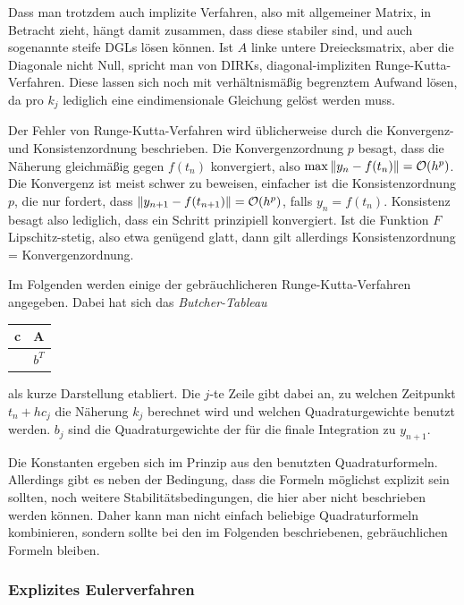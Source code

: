 Dass man trotzdem auch implizite Verfahren, also mit allgemeiner
Matrix, in Betracht zieht, hängt damit zusammen, dass diese stabiler
sind, und auch sogenannte steife DGLs lösen können. Ist $A$ linke
untere Dreiecksmatrix, aber die Diagonale nicht Null, spricht man von
DIRKs, diagonal-impliziten Runge-Kutta-Verfahren. Diese lassen sich
noch mit verhältnismäßig begrenztem Aufwand lösen, da pro $k_j$
lediglich eine eindimensionale Gleichung gelöst werden muss.

Der Fehler von Runge-Kutta-Verfahren wird üblicherweise durch die
Konvergenz- und Konsistenzordnung beschrieben. Die Konvergenzordnung
$p$ besagt, dass die Näherung gleichmäßig gegen $f(t_n)$ konvergiert, also
$\max \left\lVert{y_n - f(t_n)}\right\rVert = \mathcal O(h^p)$. Die Konvergenz ist
meist schwer zu beweisen, einfacher ist die Konsistenzordnung $p$, die
nur fordert, dass $\left\lVert{y_{n+1} - f(t_{n+1})}\right\rVert = \mathcal O(h^p)$, falls
$y_n=f(t_n)$. Konsistenz besagt also lediglich, dass ein Schritt
prinzipiell konvergiert. Ist die Funktion $F$ Lipschitz-stetig, also
etwa genügend glatt, dann gilt allerdings Konsistenzordnung =
Konvergenzordnung.

%
Im Folgenden werden einige der gebräuchlicheren Runge-Kutta-Verfahren
angegeben. Dabei hat sich das \emph{Butcher-Tableau}
\begin{center}
  \renewcommand{\arraystretch}{1.3}
  \begin{tabular}{r|l}
    c & A \\\hline
    & $b^T$
  \end{tabular}
\end{center}
als kurze Darstellung etabliert. Die $j$-te Zeile gibt dabei an, zu
welchen Zeitpunkt $t_n + hc_j$ die Näherung $k_j$ berechnet wird und
welchen Quadraturgewichte benutzt werden. $b_j$ sind die
Quadraturgewichte der für die finale Integration zu $y_{n+1}$.

Die Konstanten ergeben sich im Prinzip aus den benutzten
Quadraturformeln. Allerdings gibt es neben der Bedingung, dass die
Formeln möglichst explizit sein sollten, noch weitere
Stabilitätsbedingungen, die hier aber nicht beschrieben werden
können. Daher kann man nicht einfach beliebige Quadraturformeln
kombinieren, sondern sollte bei den im Folgenden beschriebenen,
gebräuchlichen Formeln bleiben.

\subsubsection{Explizites Eulerverfahren}

